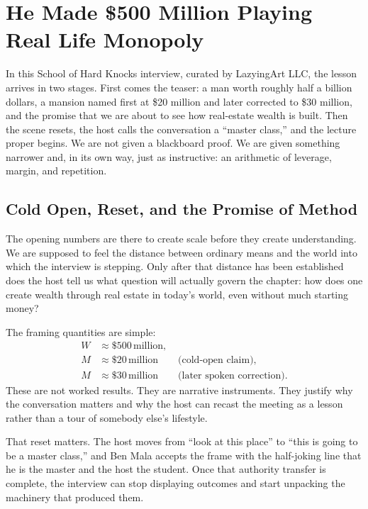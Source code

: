 \chapter{He Made \$500 Million Playing Real Life Monopoly}

In this School of Hard Knocks interview, curated by LazyingArt LLC, the lesson arrives in two stages. First comes the teaser: a man worth roughly half a billion dollars, a mansion named first at \$20 million and later corrected to \$30 million, and the promise that we are about to see how real-estate wealth is built. Then the scene resets, the host calls the conversation a ``master class,'' and the lecture proper begins. We are not given a blackboard proof. We are given something narrower and, in its own way, just as instructive: an arithmetic of leverage, margin, and repetition.

\section{Cold Open, Reset, and the Promise of Method}

The opening numbers are there to create scale before they create understanding. We are supposed to feel the distance between ordinary means and the world into which the interview is stepping. Only after that distance has been established does the host tell us what question will actually govern the chapter: how does one create wealth through real estate in today's world, even without much starting money?

The framing quantities are simple:
\begin{align}
W &\approx \$500\,\text{million},\\
M &\approx \$20\,\text{million}\qquad \text{(cold-open claim)},\\
M &\approx \$30\,\text{million}\qquad \text{(later spoken correction)}.
\end{align}
These are not worked results. They are narrative instruments. They justify why the conversation matters and why the host can recast the meeting as a lesson rather than a tour of somebody else's lifestyle.

That reset matters. The host moves from ``look at this place'' to ``this is going to be a master class,'' and Ben Mala accepts the frame with the half-joking line that he is the master and the host the student. Once that authority transfer is complete, the interview can stop displaying outcomes and start unpacking the machinery that produced them.

